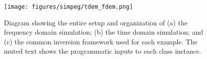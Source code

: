 \begin{figure}[!htbp]
\begin{center}
\texttt{[image: figures/simpeg/tdem\_fdem.png]}
\end{center}
\caption{
Diagram showing the entire setup and organization of (a) the frequency domain simulation; (b) the time domain simulation; and (c) the common inversion framework used for each example. The muted text shows the programmatic inputs to each class instance.
}
\label{fig:simpeg-tdem_fdem}
\end{figure}

